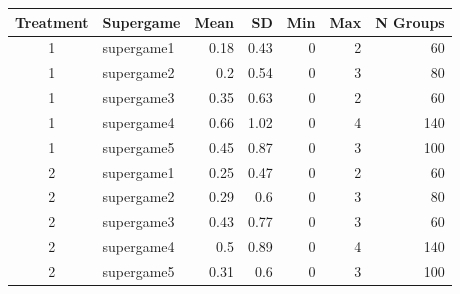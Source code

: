 \begin{tabular}{clrrrrr}
  \toprule
  Treatment & Supergame & Mean & SD & Min & Max & N Groups \\ 
  \midrule
  1 & supergame1 & 0.18 & 0.43 & 0 & 2 & 60 \\ 
  1 & supergame2 & 0.2 & 0.54 & 0 & 3 & 80 \\ 
  1 & supergame3 & 0.35 & 0.63 & 0 & 2 & 60 \\ 
  1 & supergame4 & 0.66 & 1.02 & 0 & 4 & 140 \\ 
  1 & supergame5 & 0.45 & 0.87 & 0 & 3 & 100 \\ 
  2 & supergame1 & 0.25 & 0.47 & 0 & 2 & 60 \\ 
  2 & supergame2 & 0.29 & 0.6 & 0 & 3 & 80 \\ 
  2 & supergame3 & 0.43 & 0.77 & 0 & 3 & 60 \\ 
  2 & supergame4 & 0.5 & 0.89 & 0 & 4 & 140 \\ 
  2 & supergame5 & 0.31 & 0.6 & 0 & 3 & 100 \\ 
  \bottomrule
\end{tabular}
